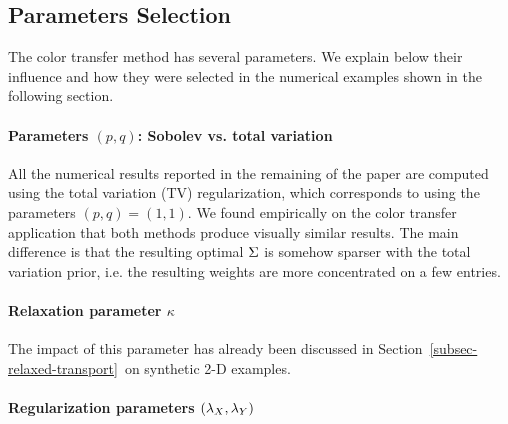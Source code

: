 \subsection{Parameters Selection}

The color transfer method has several parameters. We explain below their influence and how they were selected in the numerical examples shown in the following section.


\paragraph{Parameters $(p,q)$: Sobolev vs. total variation}

All the numerical results reported in the remaining of the paper are computed using the total variation (TV) regularization, which corresponds to using the parameters $(p,q)=(1,1)$. We found empirically on the color transfer application that both methods produce visually similar results. The main difference is that the resulting optimal $\Sigma$ is somehow sparser with the total variation prior, i.e. the resulting weights are more concentrated on a few entries. 


\paragraph{Relaxation parameter $\kappa$ } 

The impact of this parameter has already been discussed in Section~\ref{subsec-relaxed-transport}~on synthetic 2-D examples. 

\paragraph{Regularization parameters $(\lambda_X,\lambda_Y)$} 

